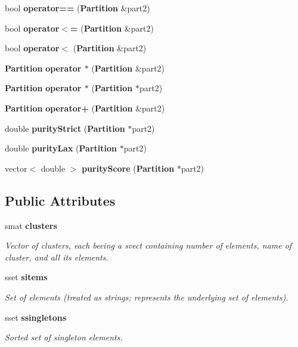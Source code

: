 \begin{CompactItemize}
\item 
bool {\bf operator==} ({\bf Partition} \&part2)\label{classPartition_a33}

\item 
bool {\bf operator$<$=} ({\bf Partition} \&part2)\label{classPartition_a34}

\item 
bool {\bf operator$<$} ({\bf Partition} \&part2)\label{classPartition_a35}

\item 
{\bf Partition} {\bf operator $\ast$} ({\bf Partition} \&part2)\label{classPartition_a36}

\item 
{\bf Partition} {\bf operator $\ast$} ({\bf Partition} $\ast$part2)\label{classPartition_a37}

\item 
{\bf Partition} {\bf operator+} ({\bf Partition} \&part2)
\item 
double {\bf purity\-Strict} ({\bf Partition} $\ast$part2)\label{classPartition_a39}

\item 
double {\bf purity\-Lax} ({\bf Partition} $\ast$part2)\label{classPartition_a40}

\item 
vector$<$ double $>$ {\bf purity\-Score} ({\bf Partition} $\ast$part2)
\end{CompactItemize}
\subsection*{Public Attributes}
\begin{CompactItemize}
\item 
smat {\bf clusters}\label{classPartition_o0}

\begin{CompactList}\small\item\em Vector of clusters, each beeing a svect containing number of elements, name of cluster, and all its elements. \item\end{CompactList}\item 
sset {\bf sitems}\label{classPartition_o1}

\begin{CompactList}\small\item\em Set of elements (treated as strings; represents the underlying set of elements). \item\end{CompactList}\item 
sset {\bf ssingletons}\label{classPartition_o2}

\begin{CompactList}\small\item\em Sorted set of singleton elements. \item\end{CompactList}\end{CompactItemize}


